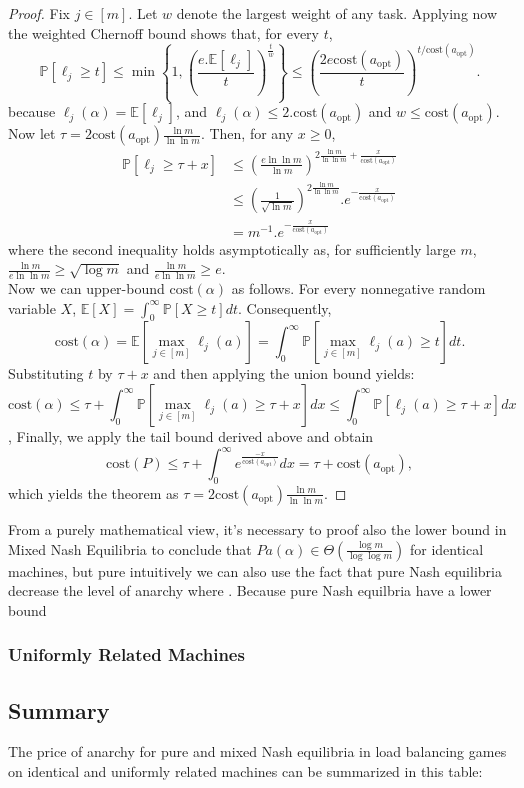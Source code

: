 \documentclass[a4paper,11pt]{article}
\renewcommand{\P}{{\mathbb P}}
\newcommand{\E}{{\mathbb E}}
\newcommand{\cost}{\text{cost}}
\newcommand{\opt}{\text{opt}}
\newcommand{\copt}{\cost(a_{\opt})}
\begin{document}
\begin{proof}
Fix $j \in [m]$. Let $w$ denote the largest weight of any task. Applying now the weighted Chernoff bound shows that, for every $t$,
$$\P[\ell_j \geq t] \leq \min\left\{1, \left(\frac{e.\E[\ell_j]}{t}\right)^{\frac{t}{w}} \right\}      \leq \left(\frac{2e\copt}{t}\right)^{t/\copt}.$$
because $\ell_j(\alpha) = \E[\ell_j]$, and $\ell_j(\alpha) \leq 2.\copt$ and $w \leq \copt$. Now let $\tau = 2\copt\frac{\ln m}{\ln \ln m}$. Then, for any $x \geq 0$,
\begin{eqnarray*}
\P[\ell_j \geq \tau + x] &\leq \left(\frac{e\ln\ln m}{\ln m}\right)^{2\frac{\ln m}{\ln \ln m} + \frac{x}{\copt}}\\
&\leq  \left(\frac{1}{\sqrt{\ln m}}\right)^{2\frac{\ln m}{\ln \ln m}}.e^{-\frac{x}{\copt}}\\
&= m^{-1}.e^{-\frac{x}{\copt}}
\end{eqnarray*}
where the second inequality holds asymptotically as, for sufficiently large $m$, $\frac{\ln m}{e \ln \ln m} \geq \sqrt{\log m}$ and $\frac{\ln m}{e \ln \ln m} \geq e$.\\
Now we can upper-bound $\cost(\alpha)$ as follows. For every nonnegative random variable $X$, $\E[X] = \int_0^\infty \P[X \geq t]dt$. Consequently,
$$\cost(\alpha) = \E\left[\max_{j\in[m]}\ell_j(a)\right] = \displaystyle\int_0^\infty{\P[\max_{j\in[m]}\ell_j(a) \geq t]}dt.$$
Substituting $t$ by $\tau + x$ and then applying the union bound yields:
$$\cost(\alpha) \leq \tau + \displaystyle\int_0^\infty{\P[\max_{j\in[m]}\ell_j(a) \geq \tau + x]}dx \leq 
\displaystyle\int_0^\infty{\P[\ell_j(a) \geq \tau + x]}dx$$, 
Finally, we apply the tail bound derived above and obtain
$$\cost(P) \leq \tau + \displaystyle\int_0^\infty{e^{\frac{-x}{\copt}}}dx = \tau + \copt,$$
which yields the theorem as $\tau = 2\copt\frac{\ln m}{\ln\ln m}.$

\end{proof}
From a purely mathematical view, it's necessary to proof also the lower bound in Mixed Nash Equilibria to conclude that $Pa(\alpha) \in \Theta(\frac{\log m}{\log \log m})$ for identical machines, but pure intuitively we can also use the fact that pure Nash equilibria decrease the level of anarchy where . Because pure Nash equilbria have a lower bound
\subsubsection {Uniformly Related Machines}

\subsection{Summary}
The price of anarchy for pure and mixed Nash equilibria in load balancing games on identical and uniformly related machines can be summarized in this table:
\end{document}
